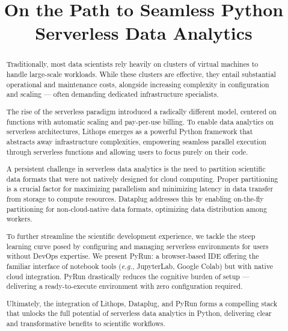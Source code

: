 
\title{On the Path to Seamless Python Serverless Data Analytics}

\begin{abstract}
Traditionally, most data scientists rely heavily on clusters of virtual machines to handle large-scale workloads. While these clusters are effective, they entail substantial operational and maintenance costs, alongside increasing complexity in configuration and scaling — often demanding dedicated infrastructure specialists.

The rise of the serverless paradigm introduced a radically different model, centered on functions with automatic scaling and pay-per-use billing. To enable data analytics on serverless architectures, Lithops emerges as a powerful Python framework that abstracts away infrastructure complexities, empowering seamless parallel execution through serverless functions and allowing users to focus purely on their code.

A persistent challenge in serverless data analytics is the need to partition scientific data formats that were not natively designed for cloud computing. Proper partitioning is a crucial factor for maximizing parallelism and minimizing latency in data transfer from storage to compute resources. Dataplug addresses this by enabling on-the-fly partitioning for non-cloud-native data formats, optimizing data distribution among workers.

To further streamline the scientific development experience, we tackle the steep learning curve posed by configuring and managing serverless environments for users without DevOps expertise. We present PyRun: a browser-based IDE offering the familiar interface of notebook tools (\textit{e.g.}, JupyterLab, Google Colab) but with native cloud integration. PyRun drastically reduces the cognitive burden of setup — delivering a ready-to-execute environment with zero configuration required.

Ultimately, the integration of Lithops, Dataplug, and PyRun forms a compelling stack that unlocks the full potential of serverless data analytics in Python, delivering clear and transformative benefits to scientific workflows.

\end{abstract}

